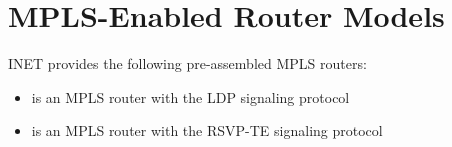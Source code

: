 \section{MPLS-Enabled Router Models}

INET provides the following pre-assembled MPLS routers:

\begin{itemize}
  \item {} is an MPLS router with the LDP signaling protocol
  \item {} is an MPLS router with the RSVP-TE signaling protocol
\end{itemize}



